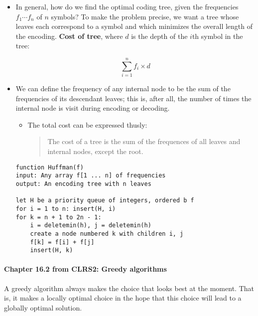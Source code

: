 \documentclass[a4paper,11pt]{article}
\begin{document}
\begin{itemize}
\item
  In general, how do we find the optimal coding tree, given the
  frequencies $f_1 \cdots f_n$ of $n$ symbols? To make the problem
  precise, we want a tree whose leaves each correspond to a symbol and
  which minimizes the overall length of the encoding. \textbf{Cost of
  tree}, where $d$ is the depth of the $i$th symbol in the tree:

  \[\sum_{i = 1}^n f_i \times d\]
\item
  We can define the frequency of any internal node to be the sum of the
  frequencies of its descendant leaves; this is, after all, the number
  of times the internal node is visit during encoding or decoding.

  \begin{itemize}
  \item
    The total cost can be expressed thusly:

    \begin{quote}
    The cost of a tree is the sum of the frequences of all leaves and
    internal nodes, except the root.
    \end{quote}
  \end{itemize}

\begin{verbatim}
function Huffman(f)
input: Any array f[1 ... n] of frequencies
output: An encoding tree with n leaves

let H be a priority queue of integers, ordered b f
for i = 1 to n: insert(H, i)
for k = n + 1 to 2n - 1:
    i = deletemin(h), j = deletemin(h)
    create a node numbered k with children i, j
    f[k] = f[i] + f[j]
    insert(H, k)
\end{verbatim}
\end{itemize}

\paragraph{Chapter 16.2 from CLRS2: Greedy
algorithms}\label{chapter-16.2-from-clrs2-greedy-algorithms}

\begin{description}
\itemsep1pt\parskip0pt
\item[Greedy algorithm]
A greedy algorithm always makes the choice that looks best at the
moment. That is, it makes a locally optimal choice in the hope that this
choice will lead to a globally optimal solution.
\end{description}
\end{document}
